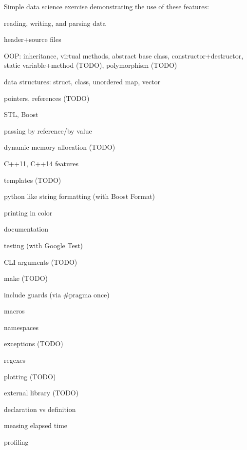 Simple data science exercise demonstrating the use of these features\+:


\begin{DoxyItemize}
\item reading, writing, and parsing data
\item header+source files
\item O\+OP\+: inheritance, virtual methods, abstract base class, constructor+destructor, static variable+method (T\+O\+DO), polymorphism (T\+O\+DO)
\item data structures\+: struct, class, unordered map, vector
\item pointers, references (T\+O\+DO)
\item S\+TL, Boost
\item passing by reference/by value
\item dynamic memory allocation (T\+O\+DO)
\item C++11, C++14 features
\item templates (T\+O\+DO)
\item python like string formatting (with Boost Format)
\item printing in color
\item documentation
\item testing (with Google Test)
\item C\+LI arguments (T\+O\+DO)
\item make (T\+O\+DO)
\item include guards (via \#pragma once)
\item macros
\item namespaces
\item exceptions (T\+O\+DO)
\item regexes
\item plotting (T\+O\+DO)
\item external library (T\+O\+DO)
\item declaration vs definition
\item measing elapsed time
\item profiling
\end{DoxyItemize}

